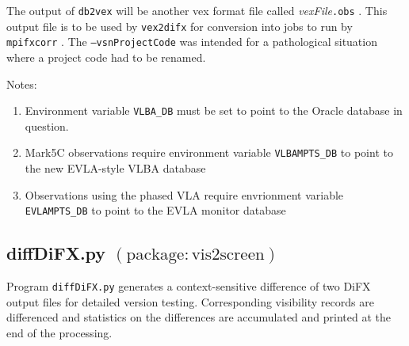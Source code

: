 \noindent
The output of {\tt db2vex} will be another vex format file called {\em vexFile}{\tt .obs} .
This output file is to be used by {\tt vex2difx} for conversion into jobs to run by {\tt mpifxcorr} .
The {\tt --vsnProjectCode} was intended for a pathological situation where a project code had to be renamed.

\noindent
Notes: 
\begin{enumerate}
\item Environment variable {\tt VLBA\_DB} must be set to point to the Oracle database in question.
\item Mark5C observations require environment variable {\tt VLBAMPTS\_DB} to point to the new EVLA-style VLBA database
\item Observations using the phased VLA require envrionment variable {\tt EVLAMPTS\_DB} to point to the EVLA monitor database
\end{enumerate}





\subsection{diffDiFX.py {\small $\mathrm{(package: vis2screen)}$}} \label{sec:diffDiFX} 

Program {\tt diffDiFX.py} generates a context-sensitive difference of two DiFX output files for detailed version testing.  Corresponding visibility records are differenced and statistics on the differences are accumulated and printed at the end of the processing.

